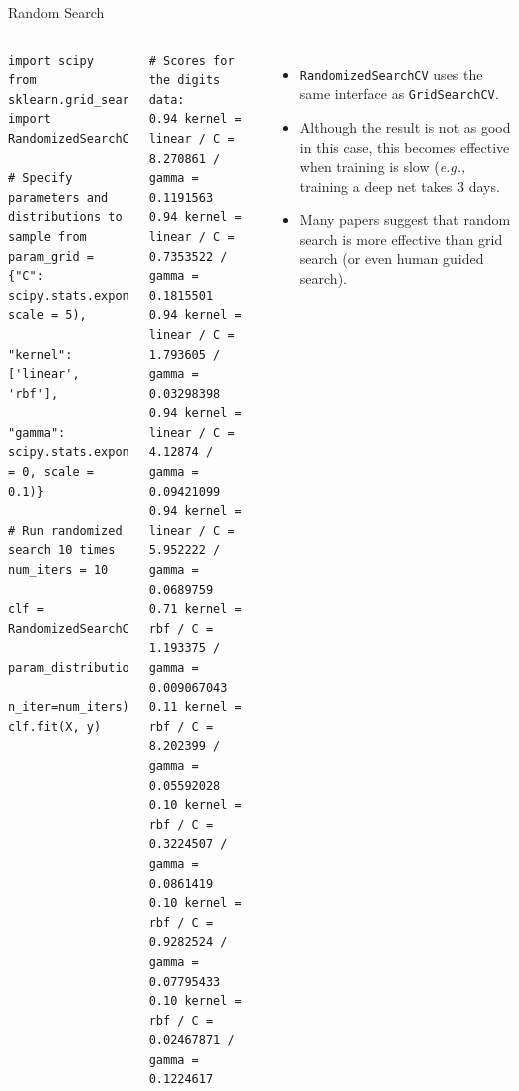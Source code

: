 \documentclass[10pt, aspectratio=169]{beamer} %
\begin{document}
\begin{frame}[fragile]{Random Search}
\begin{columns}[onlytextwidth]
\begin{lstlisting}
import scipy
from sklearn.grid_search import RandomizedSearchCV

# Specify parameters and distributions to sample from
param_grid = {"C": scipy.stats.expon(loc=0, scale = 5),
              "kernel": ['linear', 'rbf'],
              "gamma": scipy.stats.expon(loc = 0, scale = 0.1)}

# Run randomized search 10 times
num_iters = 10

clf = RandomizedSearchCV(SVC(), 
                         param_distributions=param_grid,
                         n_iter=num_iters)
clf.fit(X, y)
\end{lstlisting}
\begin{lstlisting}
# Scores for the digits data:
0.94 kernel = linear / C = 8.270861 / gamma = 0.1191563
0.94 kernel = linear / C = 0.7353522 / gamma = 0.1815501
0.94 kernel = linear / C = 1.793605 / gamma = 0.03298398
0.94 kernel = linear / C = 4.12874 / gamma = 0.09421099
0.94 kernel = linear / C = 5.952222 / gamma = 0.0689759
0.71 kernel = rbf / C = 1.193375 / gamma = 0.009067043
0.11 kernel = rbf / C = 8.202399 / gamma = 0.05592028
0.10 kernel = rbf / C = 0.3224507 / gamma = 0.0861419
0.10 kernel = rbf / C = 0.9282524 / gamma = 0.07795433
0.10 kernel = rbf / C = 0.02467871 / gamma = 0.1224617
\end{lstlisting}
\begin{itemize}
\item \texttt{RandomizedSearchCV} uses the same interface as \verb+GridSearchCV+.
\item Although the result is not as good in this case, this becomes effective 
when training is slow (\emph{e.g.,} training a deep net takes 3 days.
\item Many papers suggest that random search is more effective than grid search
(or even human guided search).
\end{itemize}
\end{columns}
\end{frame}
\end{document}
